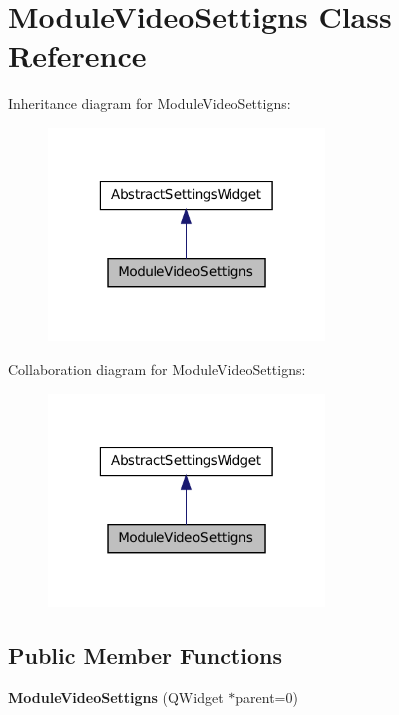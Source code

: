\hypertarget{class_module_video_settigns}{
\section{ModuleVideoSettigns Class Reference}
\label{d6/d30/class_module_video_settigns}
}


Inheritance diagram for ModuleVideoSettigns:\nopagebreak
\begin{figure}[H]
\begin{center}
\leavevmode
\includegraphics[width=208pt]{d1/ded/class_module_video_settigns__inherit__graph}
\end{center}
\end{figure}


Collaboration diagram for ModuleVideoSettigns:\nopagebreak
\begin{figure}[H]
\begin{center}
\leavevmode
\includegraphics[width=208pt]{d0/d8d/class_module_video_settigns__coll__graph}
\end{center}
\end{figure}
\subsection*{Public Member Functions}
\begin{DoxyCompactItemize}
\item 
\hypertarget{class_module_video_settigns_a2402a102183a8085a559e29560cc738c}{
{\bfseries ModuleVideoSettigns} (QWidget $\ast$parent=0)}
\label{d6/d30/class_module_video_settigns_a2402a102183a8085a559e29560cc738c}

\end{DoxyCompactItemize}
